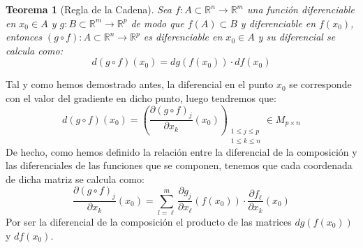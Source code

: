 \documentclass[10pt,a4paper,openright]{book}
\theoremstyle{break}
\newtheorem*{theo}{Teorema}
\begin{document}
\begin{theo}[Regla de la Cadena]
Sea $f: A \subset \mathbb{R}^n \to \mathbb{R}^m$ una función diferenciable en $x_0 \in A$ y $g: B \subset \mathbb{R}^m \to \mathbb{R}^p$ de modo que $f(A) \subset B$ y diferenciable en $f(x_0)$, entonces $\left(g \circ f\right) : A \subset \mathbb{R}^n \to \mathbb{R}^p$ es diferenciable en $x_0 \in A$ y su diferencial se calcula como:
$$d(g \circ f)(x_0) = dg(f(x_0)) \cdot df(x_0)$$
\end{theo}

Tal y como hemos demostrado antes, la diferencial en el punto $x_0$ se corresponde con el valor del gradiente en dicho punto, luego tendremos que:
$$d(g \circ f)(x_0) = \left( \frac{\partial (g \circ f)_j}{\partial x_k} (x_0) \right)_{\substack{1 \leq j \leq p \\ 1 \leq k \leq n
}}\in M_{p \times n}$$
De hecho, como hemos definido la relación entre la diferencial de la composición y las diferenciales de las funciones que se componen, tenemos que cada coordenada de dicha matriz se calcula como:
$$\frac{\partial (g \circ f)_j}{\partial x_k} (x_0) = \sum_{l = \ell}^{m} \frac{\partial g_j}{\partial x_\ell} (f(x_0)) \cdot \frac{\partial f_\ell}{\partial x_k}(x_0)$$
Por ser la diferencial de la composición el producto de las matrices $dg(f(x_0))$ y $df(x_0)$.
\end{document}
